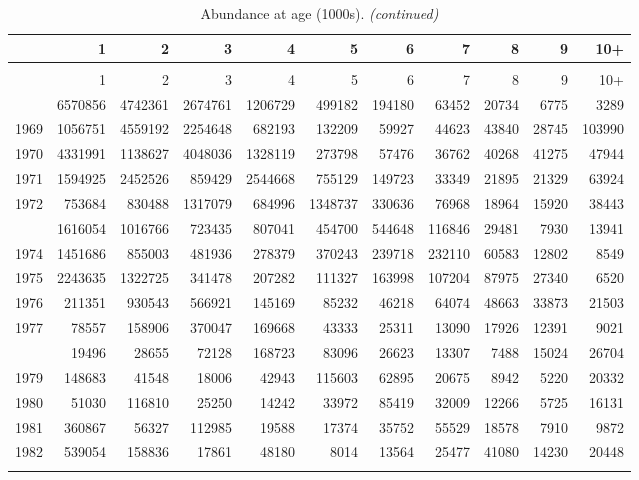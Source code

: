 \documentclass[
]{article}
\begin{document}
\begin{longtable}[t]{lrrrrrrrrrr}
\caption{\label{tab:NAA-table}Abundance at age (1000s).}\\
\toprule
  & 1 & 2 & 3 & 4 & 5 & 6 & 7 & 8 & 9 & 10+\\
\midrule
\endfirsthead
\caption[]{Abundance at age (1000s). \textit{(continued)}}\\
\toprule
  & 1 & 2 & 3 & 4 & 5 & 6 & 7 & 8 & 9 & 10+\\
\midrule
\endhead

\endfoot
\bottomrule
\endlastfoot
1968 & 6570856 & 4742361 & 2674761 & 1206729 & 499182 & 194180 & 63452 & 20734 & 6775 & 3289\\
1969 & 1056751 & 4559192 & 2254648 & 682193 & 132209 & 59927 & 44623 & 43840 & 28745 & 103990\\
1970 & 4331991 & 1138627 & 4048036 & 1328119 & 273798 & 57476 & 36762 & 40268 & 41275 & 47944\\
1971 & 1594925 & 2452526 & 859429 & 2544668 & 755129 & 149723 & 33349 & 21895 & 21329 & 63924\\
1972 & 753684 & 830488 & 1317079 & 684996 & 1348737 & 330636 & 76968 & 18964 & 15920 & 38443\\
\addlinespace
1973 & 1616054 & 1016766 & 723435 & 807041 & 454700 & 544648 & 116846 & 29481 & 7930 & 13941\\
1974 & 1451686 & 855003 & 481936 & 278379 & 370243 & 239718 & 232110 & 60583 & 12802 & 8549\\
1975 & 2243635 & 1322725 & 341478 & 207282 & 111327 & 163998 & 107204 & 87975 & 27340 & 6520\\
1976 & 211351 & 930543 & 566921 & 145169 & 85232 & 46218 & 64074 & 48663 & 33873 & 21503\\
1977 & 78557 & 158906 & 370047 & 169668 & 43333 & 25311 & 13090 & 17926 & 12391 & 9021\\
\addlinespace
1978 & 19496 & 28655 & 72128 & 168723 & 83096 & 26623 & 13307 & 7488 & 15024 & 26704\\
1979 & 148683 & 41548 & 18006 & 42943 & 115603 & 62895 & 20675 & 8942 & 5220 & 20332\\
1980 & 51030 & 116810 & 25250 & 14242 & 33972 & 85419 & 32009 & 12266 & 5725 & 16131\\
1981 & 360867 & 56327 & 112985 & 19588 & 17374 & 35752 & 55529 & 18578 & 7910 & 9872\\
1982 & 539054 & 158836 & 17861 & 48180 & 8014 & 13564 & 25477 & 41080 & 14230 & 20448\\
\addlinespace

\end{longtable}
\end{document}
